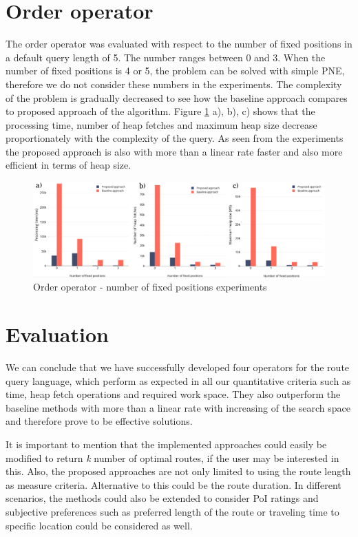 \section{Order operator}
\label{sec:experimentsOrder}

The order operator was evaluated with respect to the number of fixed positions in a default query length of 5. The number ranges between 0 and 3. When the number of fixed positions is 4 or 5, the problem can be solved with simple PNE, therefore we do not consider these numbers in the experiments. The complexity of the problem is gradually decreased to see how the baseline approach compares to proposed approach of the algorithm.  
Figure \ref{fig:order} a), b), c) shows that the processing time, number of heap fetches and maximum heap size decrease proportionately with the complexity of the query. As seen from the experiments the proposed approach is also with more than a linear rate faster and also more efficient in terms of heap size.

\begin{figure}[H]
	\includegraphics[scale=0.3]{images/order.png}
	\centering
	\caption{Order operator - number of fixed positions experiments}
	\label{fig:order}
\end{figure}

\section{Evaluation}
\label{sec:eval}

We can conclude that we have successfully developed four operators for the route query language, which perform as expected in all our quantitative criteria such as time, heap fetch operations and required work space. They also outperform the baseline methods with more than a linear rate with increasing of the search space and therefore prove to be effective solutions.

It is important to mention that the implemented approaches could easily be modified to return \textit{k} number of optimal routes, if the user may be interested in this. Also, the proposed approaches are not only limited to using the route length  as measure criteria. Alternative to this could be the route duration. In different scenarios, the methods could also be extended to consider PoI ratings and subjective preferences such as preferred length of the route or traveling time to  specific location could be considered as well.  

